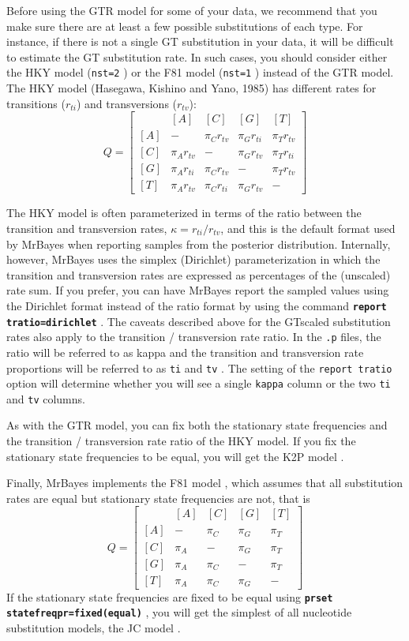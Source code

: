 \documentclass[12pt]{book}
\newcommand{\ttt}[1]{\texttt{#1} }
\newcommand{\tb}[1]{\texttt{\textbf{#1}} }
\begin{document}
Before using the GTR model for some of your data, we recommend that you make sure there are at
least a few possible substitutions of each type. For instance, if there is not a single GT
substitution in your data, it will be difficult to estimate the GT substitution rate. In such
cases, you should consider either the HKY model (\ttt{nst=2}) or the F81 model (\ttt{nst=1})
instead of the GTR model. The HKY model (Hasegawa, Kishino and Yano, 1985) has different rates for
transitions ($r_{ti}$) and transversions ($r_{tv}$): \[ Q=\begin{bmatrix} & [A] & [C] & [G] & [T]
    \\ [A]& - & \pi_C r_{tv} & \pi_G r_{ti} & \pi_T r_{tv}\\ [C]& \pi_A r_{tv} & - & \pi_G r_{tv}
&\pi_T r_{ti} \\ [G]& \pi_A r_{ti} & \pi_C r_{tv}& - & \pi_T r_{tv}\\ [T]& \pi_A r_{tv} & \pi_C
r_{ti}&\pi_G r_{tv}  & - \end{bmatrix} \]

The HKY model is often parameterized in terms of the ratio between the transition and transversion
rates, $\kappa = r_{ti}/r_{tv}$, and this is the default format used by MrBayes when reporting
samples from the posterior distribution. Internally, however, MrBayes uses the simplex (Dirichlet)
parameterization in which the transition and transversion rates are expressed as percentages of the
(unscaled) rate sum. If you prefer, you can have MrBayes report the sampled values using the
Dirichlet format instead of the ratio format by using the command \tb{report tratio=dirichlet}. The
caveats described above for the GTscaled substitution rates also apply to the transition /
transversion rate ratio. In the \ttt{.p} files, the ratio will be referred to as kappa and the
transition and transversion rate proportions will be referred to as \ttt{ti} and \ttt{tv}. The
setting of the \ttt{report tratio} option will determine whether you will see a single \ttt{kappa}
column or the two \ttt{ti} and \ttt{tv} columns.

As with the GTR model, you can fix both the stationary state frequencies and the transition /
transversion rate ratio of the HKY model. If you fix the stationary state frequencies to be equal,
you will get the K2P model \citep{kimura80}.

Finally, MrBayes implements the F81 model \citep{felsenstein81}, which assumes that all
substitution rates are equal but stationary state frequencies are not, that is
\[
Q=\begin{bmatrix}
    & [A] & [C] & [G] & [T] \\ 
 [A]& - & \pi_C & \pi_G & \pi_T\\ 
 [C]& \pi_A & - & \pi_G &\pi_T \\ 
 [G]& \pi_A & \pi_C& - & \pi_T\\ 
 [T]& \pi_A & \pi_C&\pi_G  & -
\end{bmatrix}
\]
If the stationary state frequencies are fixed to be equal using \tb{prset
statefreqpr=fixed(equal)}, you will get the simplest of all nucleotide substitution models, the
JC model \citep{jukes69}.
\end{document}
